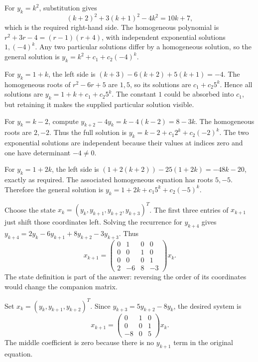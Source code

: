 For $y_k=k^2$, substitution gives
\[
 (k+2)^2+3(k+1)^2-4k^2=10k+7,
\]
which is the required right-hand side. The homogeneous polynomial is
$r^2+3r-4=(r-1)(r+4)$, with independent exponential solutions
$1,(-4)^k$. Any two particular solutions differ by a homogeneous solution,
so the general solution is $y_k=k^2+c_1+c_2(-4)^k$.

For $y_k=1+k$, the left side is
$(k+3)-6(k+2)+5(k+1)=-4$.
The homogeneous roots of $r^2-6r+5$ are $1,5$, so its solutions are
$c_1+c_2 5^k$. Hence all solutions are
$y_k=1+k+c_1+c_2 5^k$. The constant $1$ could be absorbed into $c_1$,
but retaining it makes the supplied particular solution visible.

For $y_k=k-2$, compute $y_{k+2}-4y_k=k-4(k-2)=8-3k$.
The homogeneous roots are $2,-2$. Thus the full solution is
$y_k=k-2+c_1 2^k+c_2(-2)^k$. The two exponential solutions are independent
because their values at indices zero and one have determinant $-4\ne0$.

For $y_k=1+2k$, the left side is
$(1+2(k+2))-25(1+2k)=-48k-20$, exactly as required.
The associated homogeneous equation has roots $5,-5$.
Therefore the general solution is $y_k=1+2k+c_1 5^k+c_2(-5)^k$.

Choose the state $x_k=(y_k,y_{k+1},y_{k+2},y_{k+3})^T$.
The first three entries of $x_{k+1}$ just shift those coordinates left.
Solving the recurrence for $y_{k+4}$ gives
$y_{k+4}=2y_k-6y_{k+1}+8y_{k+2}-3y_{k+3}$.
Thus
\[
 x_{k+1}=\begin{pmatrix}0&1&0&0\\0&0&1&0\\0&0&0&1\\2&-6&8&-3\end{pmatrix}x_k.
\]
The state definition is part of the answer: reversing the order of its
coordinates would change the companion matrix.

Set $x_k=(y_k,y_{k+1},y_{k+2})^T$. Since
$y_{k+3}=5y_{k+2}-8y_k$, the desired system is
\[
 x_{k+1}=\begin{pmatrix}0&1&0\\0&0&1\\-8&0&5\end{pmatrix}x_k.
\]
The middle coefficient is zero because there is no $y_{k+1}$ term in the
original equation.

